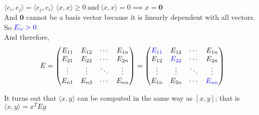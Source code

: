\documentclass[11 pt]{article}
\newcommand{\br}[2]{\left[#1,#2\right]}
\newcommand{\inp}[2]{\langle #1, #2 \rangle}
\newcommand{\zvec}{\mathbf{0}}
\newcommand{\blu}[1]{{\color{blue} #1}}
\begin{document}
    \\$\inp{e_i}{e_j} = \inp{e_j}{e_i}$
    $\inp{x}{x} \ge 0 \ \text{and} \ \inp{x}{x}=0 \implies x=\zvec$
    \\And $\zvec$ cannot be a basis vector because it is linearly dependent with all vectors.
    \\So $\blu{E_{ii}>0}$
    \\And therefore,
    $$
        E = \begin{pmatrix}
                E_{11} & E_{12} & \cdots & E_{1n} \\
                E_{21} & E_{22} & \cdots & E_{2n} \\
                \vdots & \vdots & \ddots & \vdots \\
                E_{n1} & E_{n2} & \cdots & E_{nn}
            \end{pmatrix}
          = \begin{pmatrix}
            \blu{E_{11}} & E_{12} & \cdots & E_{1n} \\
            E_{12} & \blu{E_{22}} & \cdots & E_{2n} \\
            \vdots & \vdots & \blu{\ddots} & \vdots \\
            E_{1n} & E_{2n} & \cdots & \blu{E_{nn}}
            \end{pmatrix}
    $$

    It turns out that $\inp{x}{y}$ can be computed in the same way as
    $\br{x}{y}$; that is $\inp{x}{y} = x^{T}Ey$
\end{document}
